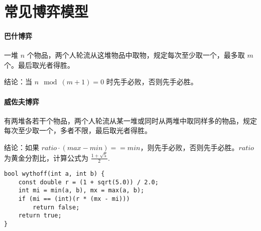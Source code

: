 \section{常见博弈模型}
\paragraph{巴什博弈} 一堆 $n$ 个物品，两个人轮流从这堆物品中取物，规定每次至少取一个，最多取 $m$ 个。最后取光者得胜。
\noindent\par 结论：当 $n \mod (m+1) = 0$ 时先手必败，否则先手必胜。
\paragraph{威佐夫博弈}有两堆各若干个物品，两个人轮流从某一堆或同时从两堆中取同样多的物品，规定每次至少取一个，多者不限，最后取光者得胜。
\noindent\par 结论：如果 $ratio \cdot (max - min) == min$，则先手必败，否则先手必胜。$ratio$ 为黄金分割比，计算公式为 $\frac{1+\sqrt{5}}{2}$.
\begin{verbatim}
bool wythoff(int a, int b) {
    const double r = (1 + sqrt(5.0)) / 2.0;
    int mi = min(a, b), mx = max(a, b);
    if (mi == (int)(r * (mx - mi)))
        return false;
    return true;
}
\end{verbatim}
